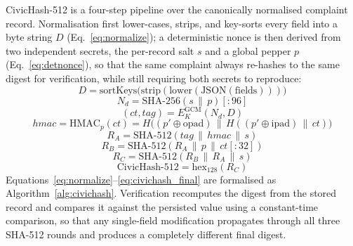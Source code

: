 \documentclass[conference]{IEEEtran}
\begin{document}
CivicHash-512 is a four-step pipeline over the canonically normalised complaint record. Normalisation first lower-cases, strips, and key-sorts every field into a byte string $D$ (Eq.~\ref{eq:normalize}); a deterministic nonce is then derived from two independent secrets, the per-record salt $s$ and a global pepper $p$ (Eq.~\ref{eq:detnonce}), so that the same complaint always re-hashes to the same digest for verification, while still requiring both secrets to reproduce:
\begin{equation}
D = \mathrm{sortKeys}\big(\mathrm{strip}(\mathrm{lower}(\mathrm{JSON}(\text{fields})))\big)
\label{eq:normalize}
\end{equation}
\begin{equation}
N_d = \mathrm{SHA\text{-}256}(s \,\|\, p)[:96]
\label{eq:detnonce}
\end{equation}
\begin{equation}
(ct, \mathit{tag}) = E^{\mathrm{GCM}}_{K}(N_d, D)
\label{eq:civichash_enc}
\end{equation}
\begin{equation}
\mathit{hmac} = \mathrm{HMAC}_{p}(ct) = H\big((p' \oplus \mathrm{opad}) \,\|\, H((p' \oplus \mathrm{ipad}) \,\|\, ct)\big)
\label{eq:hmac}
\end{equation}
\begin{equation}
R_A = \mathrm{SHA\text{-}512}(\mathit{tag} \,\|\, \mathit{hmac} \,\|\, s)
\label{eq:ra}
\end{equation}
\begin{equation}
R_B = \mathrm{SHA\text{-}512}(R_A \,\|\, p \,\|\, ct[:32])
\label{eq:rb}
\end{equation}
\begin{equation}
R_C = \mathrm{SHA\text{-}512}(R_B \,\|\, R_A \,\|\, s)
\label{eq:rc}
\end{equation}
\begin{equation}
\mathrm{CivicHash{\text{-}}512} = \mathrm{hex}_{128}(R_C)
\label{eq:civichash_final}
\end{equation}
Equations~\ref{eq:normalize}--\ref{eq:civichash_final} are formalised as Algorithm~\ref{alg:civichash}. Verification recomputes the digest from the stored record and compares it against the persisted value using a constant-time comparison, so that any single-field modification propagates through all three SHA-512 rounds and produces a completely different final digest.
\end{document}
